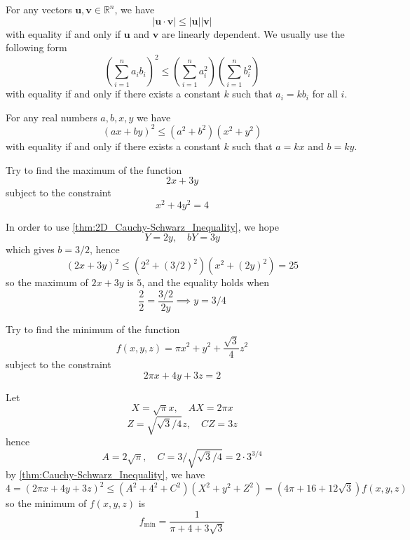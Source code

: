 \documentclass[a4]{overview}
\begin{document}
\begin{theorem}
	\label{thm:Cauchy-Schwarz_Inequality}
	For any vectors $\boldsymbol{u}, \boldsymbol{v} \in \mathbb{R}^n$, we have
	\[
		|\boldsymbol{u}\cdot \boldsymbol{v}| \leq |\boldsymbol{u}| |\boldsymbol{v}|
	\] 
	with equality if and only if $\boldsymbol{u}$ and $\boldsymbol{v}$ are linearly dependent.
	We usually use the following form
	\[
		\left(\sum_{i=1}^n a_i b_i\right)^2 \leq \left(\sum_{i=1}^n a_i^2\right)\left(\sum_{i=1}^n b_i^2\right)
	\] 
	with equality if and only if there exists a constant $k$ such that $a_i = k b_i$ for all $i$.
\end{theorem}
\begin{theorem}
	\label{thm:2D_Cauchy-Schwarz_Inequality}
	For any real numbers $a, b, x, y$ we have
	\[
		(ax+by)^2 \leq (a^2+b^2)(x^2+y^2)
	\]
	with equality if and only if there exists a constant $k$ such that $a = k x$ and $b = k y$.
\end{theorem}
\begin{example}
	Try to find the maximum of the function
	\[
	2x+3y
	\] 
	subject to the constraint
	\[
	x^2+4y^2=4
	\] 
	\begin{answer}
		In order to use \ref{thm:2D_Cauchy-Schwarz_Inequality}, we hope
		\[
		Y = 2y, \quad bY = 3y
		\] 
		which gives $b = 3/2$, hence
		\[
			(2x+3y)^2 \leq (2^2+(3/2)^2)(x^2+(2y)^2) = 25
		\] 
		so the maximum of $2x+3y$ is $5$, and the equality holds when
		\[
			\frac{2}{2} = \frac{3/2}{2y} \implies y = 3/4
		\] 
	\end{answer}

	
\end{example}
\begin{example}
	Try to find the minimum of the function
	\[
		f(x,y,z) = \pi x^2 +y ^2 + \frac{\sqrt{3}}{4}z^2
	\] 
	subject to the constraint
	\[
	2\pi x + 4y + 3z  = 2
	\] 
	\begin{answer}
		Let
		\[
			X = \sqrt{\pi}x , \quad AX = 2\pi x 
		\] 
		\[
		Z = \sqrt{\sqrt{3}/4}z, \quad CZ = 3z
		\] 
		hence
		\[
			A = 2\sqrt{\pi}, \quad
			C = {3 / \sqrt{\sqrt{3}/4}} = 2 \cdot 3^{3 / 4}
		\] 
		by \ref{thm:Cauchy-Schwarz_Inequality}, we have
		\[
			4 = (2\pi x + 4y + 3z)^2 \leq (A^2+4^2+C^2)(X^2+y^2+Z^2) 
			= (4\pi + 16 + 12\sqrt{3})f(x,y,z)
		\] 
		so the minimum of $f(x,y,z)$ is
		\[
			f_{\min} = \frac{1}{\pi + 4 + 3\sqrt{3}}
		\] 
	\end{answer}
	
\end{example}
\end{document}
